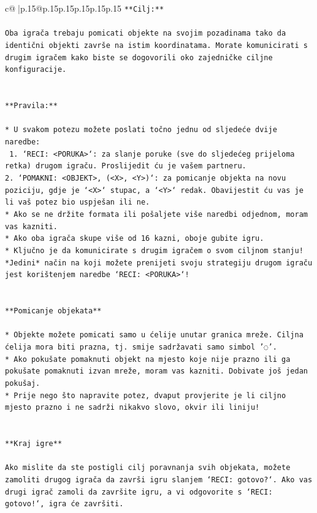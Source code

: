 \documentclass{article}
\begin{document}
{\begin{supertabular}{c@{$\;$}|p{.15\linewidth}@{}p{.15\linewidth}p{.15\linewidth}p{.15\linewidth}p{.15\linewidth}p{.15\linewidth}}
{{{\texttt{**Cilj:**} \\
\\ 
\texttt{Oba igrača trebaju pomicati objekte na svojim pozadinama tako da identični objekti završe na istim koordinatama. Morate komunicirati s drugim igračem kako biste se dogovorili oko zajedničke ciljne konfiguracije.} \\
\\ 
\\ 
\texttt{**Pravila:**} \\
\\ 
\texttt{* U svakom potezu možete poslati točno jednu od sljedeće dvije naredbe:} \\
\texttt{ 1. `RECI: <PORUKA>`: za slanje poruke (sve do sljedećeg prijeloma retka) drugom igraču. Proslijedit ću je vašem partneru.} \\
\texttt{2. `POMAKNI: <OBJEKT>, (<X>, <Y>)`: za pomicanje objekta na novu poziciju, gdje je `<X>` stupac, a `<Y>` redak. Obavijestit ću vas je li vaš potez bio uspješan ili ne.} \\
\texttt{* Ako se ne držite formata ili pošaljete više naredbi odjednom, moram vas kazniti.} \\
\texttt{* Ako oba igrača skupe više od 16 kazni, oboje gubite igru.} \\
\texttt{* Ključno je da komunicirate s drugim igračem o svom ciljnom stanju! *Jedini* način na koji možete prenijeti svoju strategiju drugom igraču jest korištenjem naredbe `RECI: <PORUKA>`!} \\
\\ 
\\ 
\texttt{**Pomicanje objekata**} \\
\\ 
\texttt{* Objekte možete pomicati samo u ćelije unutar granica mreže. Ciljna ćelija mora biti prazna, tj. smije sadržavati samo simbol '◌'.} \\
\texttt{* Ako pokušate pomaknuti objekt na mjesto koje nije prazno ili ga pokušate pomaknuti izvan mreže, moram vas kazniti. Dobivate još jedan pokušaj.} \\
\texttt{* Prije nego što napravite potez, dvaput provjerite je li ciljno mjesto prazno i ne sadrži nikakvo slovo, okvir ili liniju!} \\
\\ 
\\ 
\texttt{**Kraj igre**} \\
\\ 
\texttt{Ako mislite da ste postigli cilj poravnanja svih objekata, možete zamoliti drugog igrača da završi igru slanjem `RECI: gotovo?`. Ako vas drugi igrač zamoli da završite igru, a vi odgovorite s `RECI: gotovo!`, igra će završiti.} \\
}}}
\end{supertabular}}
\end{document}
